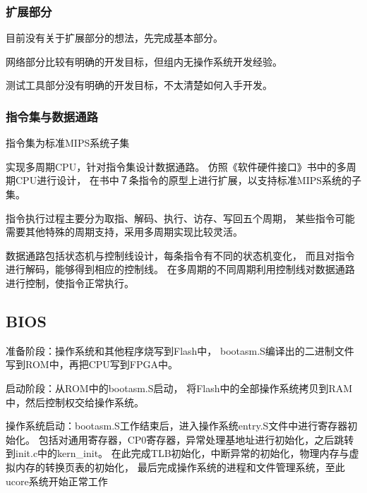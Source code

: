         \subsubsection{扩展部分}
            目前没有关于扩展部分的想法，先完成基本部分。

            网络部分比较有明确的开发目标，但组内无操作系统开发经验。

            测试工具部分没有明确的开发目标，不太清楚如何入手开发。

        \subsubsection{指令集与数据通路}
            指令集为标准MIPS系统子集

            实现多周期CPU，针对指令集设计数据通路。
            仿照《软件硬件接口》书中的多周期CPU进行设计，
            在书中７条指令的原型上进行扩展，以支持标准MIPS系统的子集。
            
            指令执行过程主要分为取指、解码、执行、访存、写回五个周期，
            某些指令可能需要其他特殊的周期支持，采用多周期实现比较灵活。

            数据通路包括状态机与控制线设计，每条指令有不同的状态机变化，
            而且对指令进行解码，能够得到相应的控制线。%
            在多周期的不同周期利用控制线对数据通路进行控制，使指令正常执行。
    
    \subsection{BIOS}
        准备阶段：操作系统和其他程序烧写到Flash中，%
        bootasm.S编译出的二进制文件写到ROM中，再把CPU写到FPGA中。

        启动阶段：从ROM中的bootasm.S启动，%
        将Flash中的全部操作系统拷贝到RAM中，然后控制权交给操作系统。

        操作系统启动：bootasm.S工作结束后，进入操作系统entry.S文件中进行寄存器初始化。
        包括对通用寄存器，CP0寄存器，异常处理基地址进行初始化，之后跳转到init.c中的kern\_init。
        在此完成TLB初始化，中断异常的初始化，物理内存与虚拟内存的转换页表的初始化，
        最后完成操作系统的进程和文件管理系统，至此ucore系统开始正常工作



